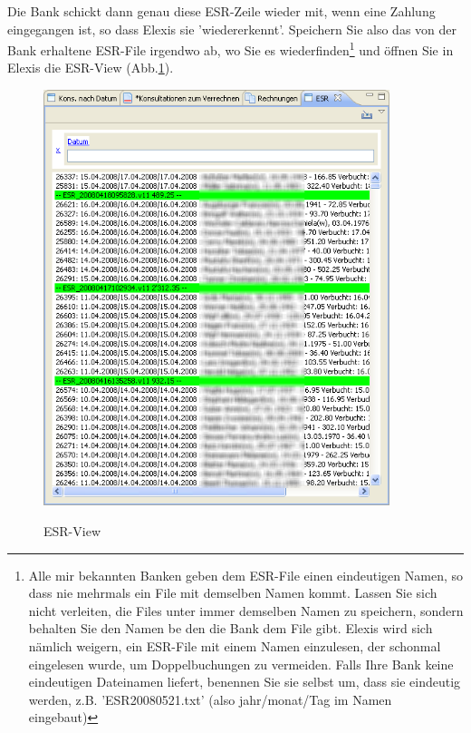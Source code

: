 \documentclass[a4paper]{scrartcl}
\begin{document}
Die Bank schickt dann genau diese ESR-Zeile wieder mit, wenn eine Zahlung eingegangen ist, so dass Elexis sie 'wiedererkennt'. Speichern Sie also das von der Bank erhaltene ESR-File irgendwo ab, wo Sie es wiederfinden\footnote{Alle mir bekannten Banken geben dem ESR-File einen eindeutigen Namen, so dass nie mehrmals ein File mit demselben Namen kommt. Lassen Sie sich nicht verleiten, die Files unter immer demselben Namen zu speichern, sondern behalten Sie den Namen be  den die Bank dem File gibt. Elexis wird sich nämlich weigern, ein ESR-File mit einem Namen einzulesen, der schonmal eingelesen wurde, um Doppelbuchungen zu vermeiden. Falls Ihre Bank keine eindeutigen Dateinamen liefert, benennen Sie sie selbst um, dass sie eindeutig werden, z.B. 'ESR20080521.txt' (also jahr/monat/Tag im Namen eingebaut)} und öffnen Sie in Elexis die ESR-View (Abb.\ref{fig:abr20}).
\begin{figure}
  \includegraphics[width=0.9\textwidth]{abr20}\\
  \caption{ESR-View}\label{fig:abr20}
\end{figure}
\end{document}
